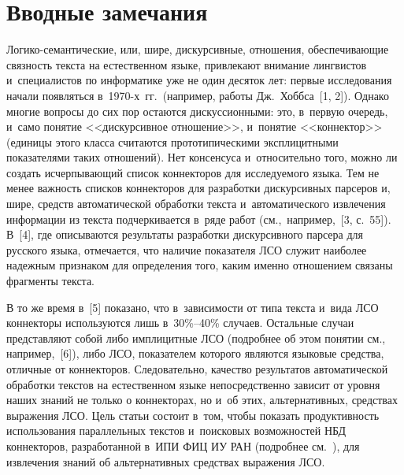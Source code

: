 

\vspace*{4pt}



\thispagestyle{headings}

\begin{multicols}{2}

\label{st\stat}

\section{Вводные замечания}

\vspace*{-6pt}

Логико-семантические, или, шире, дискурсивные, отношения, 
обеспечивающие связность текста на естественном языке, привлекают 
внимание лингвистов и~специалистов по информатике уже не один десяток 
лет: первые исследования начали появляться в~1970-х~гг.\ (например, работы 
Дж.~Хоббса~[1, 2]). Однако многие вопросы до сих пор остаются 
дискуссионными: это, в~первую очередь, и~само понятие <<дискурсивное 
отношение>>, и~понятие <<коннектор>> (единицы этого класса считаются 
прототипическими эксплицитными показателями таких отношений). Нет 
консенсуса и~относительно того, можно ли создать исчерпывающий список 
коннекторов для исследуемого языка. Тем не менее важность списков 
коннекторов для разработки дискурсивных парсеров и, шире, средств 
автоматической обработки текста и~автоматического извлечения информации 
из текста подчеркивается в~ряде работ (см.,\ например,~[3, с.~55]). В~[4], где 
описываются результаты разработки дискурсивного парсера для русского 
языка, отмечается, что наличие показателя 
ЛСО служит наиболее надежным признаком для определения 
того, каким именно отношением связаны фрагменты текста.

В то же время в~[5] показано, что в~зависимости от типа текста и~вида ЛСО 
коннекторы используются лишь в~30\%--40\% случаев. Остальные случаи 
представляют собой либо имплицитные ЛСО (подробнее об этом понятии 
см., например,~[6]), либо ЛСО, показателем которого являются языковые 
средства, отличные от коннекторов. Следовательно, качество результатов 
автоматической обработки текстов на естественном языке непосредственно 
зависит от уровня наших знаний не только о коннекторах, но и~об этих, 
альтернативных, средствах выражения ЛСО. Цель статьи состоит в~том, 
чтобы показать продуктивность использования параллельных текстов 
и~поисковых возможностей НБД коннекторов, разработанной в~ИПИ ФИЦ 
ИУ РАН (подробнее см.~\cite{7-in, 8-in, 9-in}), для извлечения знаний об 
альтернативных средствах выражения ЛСО.


\end{multicols}
